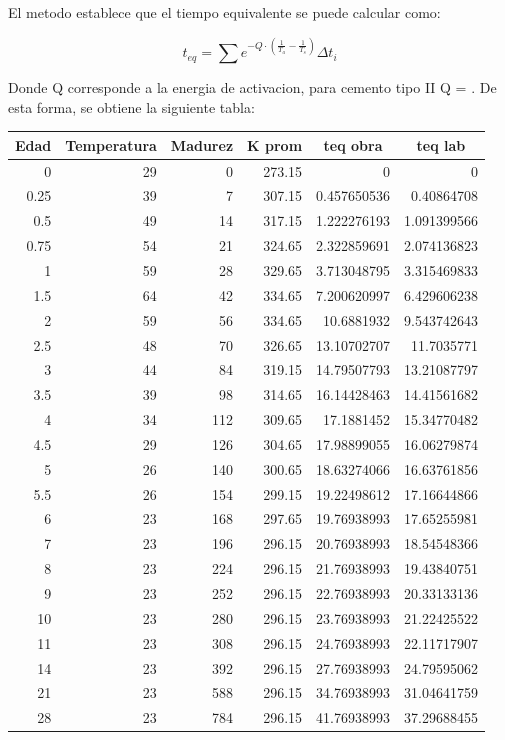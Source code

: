 El metodo establece que el tiempo equivalente se puede calcular como:

\begin{equation}
    t_{eq} = \sum e^{-Q \cdot (\frac{1}{T_a} - \frac{1}{T_s})} \Delta t_i
\end{equation}

Donde Q corresponde a la energia de activacion, para cemento tipo II Q = . De esta forma, se obtiene la siguiente tabla:

\begin{table}[H]
\centering
\renewcommand{\arraystretch}{1.15}
\begin{tabular}{r r r r r r}
\hline
\multicolumn{1}{c}{Edad} & \multicolumn{1}{c}{Temperatura} & \multicolumn{1}{c}{Madurez} & \multicolumn{1}{c}{K prom} & \multicolumn{1}{c}{teq obra} & \multicolumn{1}{c}{teq lab} \\
\hline
0 & 29 & 0 & 273.15 & 0 & 0 \\
0.25 & 39 & 7 & 307.15 & 0.457650536 & 0.40864708 \\
0.5 & 49 & 14 & 317.15 & 1.222276193 & 1.091399566 \\
0.75 & 54 & 21 & 324.65 & 2.322859691 & 2.074136823 \\
1 & 59 & 28 & 329.65 & 3.713048795 & 3.315469833 \\
1.5 & 64 & 42 & 334.65 & 7.200620997 & 6.429606238 \\
2 & 59 & 56 & 334.65 & 10.6881932 & 9.543742643 \\
2.5 & 48 & 70 & 326.65 & 13.10702707 & 11.7035771 \\
3 & 44 & 84 & 319.15 & 14.79507793 & 13.21087797 \\
3.5 & 39 & 98 & 314.65 & 16.14428463 & 14.41561682 \\
4 & 34 & 112 & 309.65 & 17.1881452 & 15.34770482 \\
4.5 & 29 & 126 & 304.65 & 17.98899055 & 16.06279874 \\
5 & 26 & 140 & 300.65 & 18.63274066 & 16.63761856 \\
5.5 & 26 & 154 & 299.15 & 19.22498612 & 17.16644866 \\
6 & 23 & 168 & 297.65 & 19.76938993 & 17.65255981 \\
7 & 23 & 196 & 296.15 & 20.76938993 & 18.54548366 \\
8 & 23 & 224 & 296.15 & 21.76938993 & 19.43840751 \\
9 & 23 & 252 & 296.15 & 22.76938993 & 20.33133136 \\
10 & 23 & 280 & 296.15 & 23.76938993 & 21.22425522 \\
11 & 23 & 308 & 296.15 & 24.76938993 & 22.11717907 \\
14 & 23 & 392 & 296.15 & 27.76938993 & 24.79595062 \\
21 & 23 & 588 & 296.15 & 34.76938993 & 31.04641759 \\
28 & 23 & 784 & 296.15 & 41.76938993 & 37.29688455 \\
\hline
\end{tabular}
\end{table}

